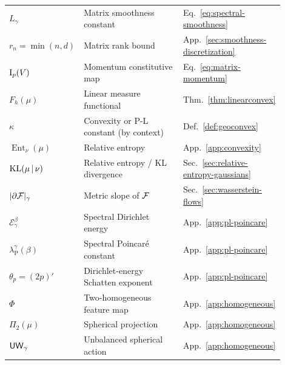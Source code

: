 \begin{longtable}{@{}p{0.23\linewidth}p{0.39\linewidth}p{0.28\linewidth}@{}}
$L_\gamma$ & Matrix smoothness constant & Eq.~\eqref{eq:spectral-smoothness} \\
$r_n=\min(n,d)$ & Matrix rank bound & App.~\ref{sec:smoothness-discretization} \\
$\mathrm{I}_p(V)$ & Momentum constitutive map & Eq.~\eqref{eq:matrix-momentum} \\
$F_h(\mu)$ & Linear measure functional & Thm.~\ref{thm:linearconvex} \\
$\kappa$ & Convexity or P-L constant (by context) & Def.~\ref{def:geoconvex} \\
$\operatorname{Ent}_\nu(\mu)$ & Relative entropy & App.~\ref{app:convexity} \\
$\mathrm{KL}(\mu\,|\,\nu)$ & Relative entropy / KL divergence & Sec.~\ref{sec:relative-entropy-gaussians} \\
$|\partial\mathcal{F}|_\gamma$ & Metric slope of $\mathcal{F}$ & Sec.~\ref{sec:wasserstein-flows} \\
$\mathcal E_\gamma^\beta$ & Spectral Dirichlet energy & App.~\ref{app:pl-poincare} \\
$\lambda_{\mathrm P}^\gamma(\beta)$ & Spectral Poincar\'e constant & App.~\ref{app:pl-poincare} \\
$\theta_p=(2p)'$ & Dirichlet-energy Schatten exponent & App.~\ref{app:pl-poincare} \\
$\Phi$ & Two-homogeneous feature map & App.~\ref{app:homogeneous} \\
$\Pi_2(\mu)$ & Spherical projection & App.~\ref{app:homogeneous} \\
$\mathsf{UW}_{\gamma}$ & Unbalanced spherical action & App.~\ref{app:homogeneous} \\
\end{longtable}
